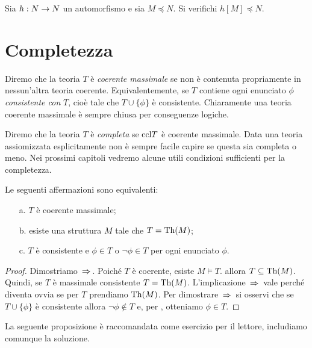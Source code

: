 \begin{exercise}
Sia $h:N\rightarrow N$ un automorfismo e sia $M\preceq N$. Si verifichi $h[M]\preceq N$.\QED
\end{exercise}


\section{Completezza}
Diremo che la teoria $T$ \`e \emph{coerente massimale\/} se non \`e contenuta propriamente in nessun'altra teoria coerente. Equivalentemente, se $T$ contiene ogni enunciato $\phi$ \emph{consistente con\/} $T$, cio\`e tale che $T\cup\{\phi\}$ \`e consistente. Chiaramente una teoria coerente massimale \`e sempre chiusa per conseguenze logiche.

Diremo che la teoria $T$ \`e \emph{completa\/} se ${\rm ccl} T$ \`e coerente massimale. Data una teoria assiomizzata esplicitamente non \`e sempre facile capire se questa sia completa o meno. Nei prossimi capitoli vedremo alcune utili condizioni sufficienti per la completezza.

\begin{proposition}\label{fattoconsistenzasen4sostretto}
Le seguenti affermazioni sono equivalenti:
\begin{itemize}
\item[a.] $T$ \`e coerente massimale;
\item[b.] esiste una struttura $M$ tale che $T=\textrm{Th}(M)$;
\item[c.] $T$ \`e consistente e $\phi\in T$ o $\neg\phi\in T$ per ogni enunciato $\phi$.
\end{itemize}
\end{proposition}
\begin{proof}
Dimostriamo $\,\Rightarrow\,$. Poich\'e $T$ \`e coerente, esiste $M\models T$. allora $T\subseteq\textrm{Th} (M)$. Quindi, se $T$ \`e massimale consistente $T=\textrm{Th}(M)$. L'implicazione $\,\Rightarrow\,$ vale perch\'e  diventa ovvia se per $T$ prendiamo $\textrm{Th}(M)$.  Per dimostrare $\,\Rightarrow\,$ si osservi che se $T\cup\{\phi\}$ \`e consistente allora $\neg\phi\not\in T$ e, per , otteniamo $\phi\in T$.
\end{proof}

La seguente proposizione \`e raccomandata come esercizio per il lettore, includiamo comunque la soluzione.  

